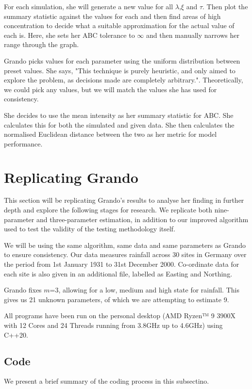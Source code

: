     For each simulation, she will generate a new value for all $\lambda$,$\xi$ and $\tau$. Then plot the summary statistic against the values for each and then find areas of high concentration to decide what a suitable approximation for the actual value of each is. Here, she sets her ABC tolerance to $\infty$ and then manually narrows her range through the graph.

    Grando picks values for each parameter using the uniform distribution between preset values. She says, "This technique is purely heuristic, and only aimed to explore the problem, as decisions made are completely arbitrary.". Theoretically, we could pick any values, but we will match the values she has used for consistency.  

    She decides to use the mean intensity as her summary statistic for ABC. She calculates this for both the simulated and given data. She then calculates the normalised Euclidean distance between the two as her metric for model performance.


\section{Replicating Grando}
\label{Replicating_Existing_Rainfall_Model:Replicating_Grando}
This section will be replicating Grando's results to analyse her finding in further depth and explore the following stages for research. We replicate both nine-parameter and three-parameter estimation, in addition to our improved algorithm used to test the validity of the testing methodology itself.

We will be using the same algorithm, same data and same parameters as Grando to ensure consistency. Our data measures rainfall across 30 sites in Germany over the period from 1st January 1931 to 31st December 2000. Co-ordinate data for each site is also given in an additional file, labelled as Easting and Northing. 

Grando fixes $m$=3, allowing for a low, medium and high state for rainfall. This gives us 21 unknown parameters, of which we are attempting to estimate 9.

All programs have been run on the personal desktop (AMD Ryzen™ 9 3900X with 12 Cores and 24 Threads running from 3.8GHz up to 4.6GHz) using C++20.


    \subsection{Code}
    \label{Replicating_Existing_Rainfall_Model:Replicating_Grando:Code}
    We present a brief summary of the coding process in this subsectino.

